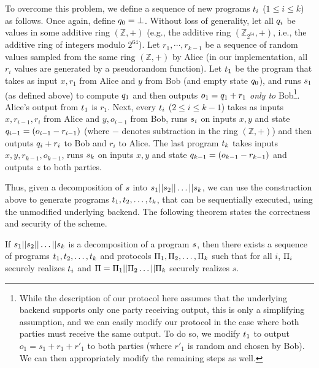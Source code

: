 To overcome this problem, we define a sequence of new programs
$t_i$ ($1\leq i\leq k$) as follows. Once again, define $q_0
= \bot$. Without
loss of generality, let all $q_i$ be values in some additive ring
$(\mathbb{Z},+)$ (e.g., the additive ring $(\mathbb{Z}_{2^{64}},+)$,
i.e., the additive ring of integers modulo $2^{64}$).
Let $r_1,\cdots,r_{k-1}$ be a sequence of random values sampled from
the same ring $(\mathbb{Z},+)$ by Alice (in our implementation, all
$r_i$ values are generated by a pseudorandom function). Let $t_1$
be the program that takes as input $x,r_1$ from Alice and $y$ from Bob
(and empty state $q_0$), and runs $s_1$ (as defined above) to
compute $q_1$ and then outputs $o_1 = q_1 + r_1$ {\em only
  to} Bob\footnote{While the description of our protocol here assumes
  that
  the underlying backend supports only one party receiving output,
  this is only a simplifying assumption, and we can easily modify our
  protocol in the case where both parties must receive the same
  output. To do so, we modify $t_1$ to output $o_1 = s_1+r_1+r'_1$ to
  both parties (where $r'_1$ is random and chosen by Bob). We can then
  appropriately modify the remaining steps as well.}. Alice's output
from $t_1$ is $r_1$. Next, every $t_i$ ($2\leq i\leq k-1$)
takes as inputs $x,r_{i-1},r_i$ from Alice and $y,o_{i-1}$ from Bob,
runs $s_i$
on inputs $x,y$ and state $q_{i-1} = (o_{i-1}-r_{i-1})$ (where $-$ denotes
subtraction in the ring $(\mathbb{Z},+)$) and then outputs $q_i+r_i$
to Bob and $r_i$ to Alice. The last
program $t_k$ takes inputs $x,y,r_{k-1},o_{k-1}$, runs $s_k$
on inputs $x,y$ and state $q_{k-1} = (o_{k-1}-r_{k-1})$ and outputs $z$ to both
parties.

Thus, given a decomposition of $s$ into
$s_1||s_2||\dots||s_k$, we can use the construction
above to generate programs $t_1,t_2,\ldots,t_k$, that
can be sequentially executed, using the unmodified underlying \mpc
backend. The following theorem states the correctness and security of
the scheme.

\begin{theorem}
If $s_1||s_2||\ldots||s_k$ is a decomposition of a program $s$, then there exists a sequence of programs $t_1, t_2, \ldots, t_k$ and protocols $\Pi_1, \Pi_2, \ldots, \Pi_k$ such that for all $i$, $\Pi_i$ securely realizes $t_i$ and  $\Pi
= \Pi_1||\Pi_2\dots||\Pi_k$ securely realizes $s$.
\end{theorem}

